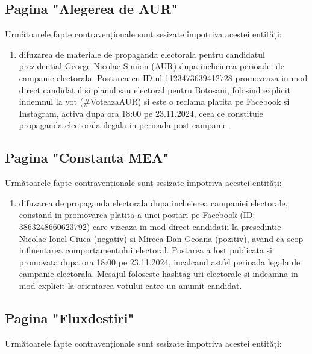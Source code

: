 \documentclass[a4paper,12pt]{article}
\begin{document}
\vspace{0.5cm}

\subsection{Pagina "Alegerea de AUR"}
Următoarele fapte contravenționale sunt sesizate împotriva acestei entități:

\begin{enumerate}[leftmargin=*, label=\arabic*.)]
    \item difuzarea de materiale de propaganda electorala pentru candidatul prezidential George Nicolae Simion (AUR) dupa incheierea perioadei de campanie electorala. Postarea cu ID-ul \href{https://www.facebook.com/ads/library/?id=1123473639412728}{1123473639412728} promoveaza in mod direct candidatul si planul sau electoral pentru Botosani, folosind explicit indemnul la vot (\#VoteazaAUR) si este o reclama platita pe Facebook si Instagram, activa dupa ora 18:00 pe 23.11.2024, ceea ce constituie propaganda electorala ilegala in perioada post-campanie.
\end{enumerate}

\vspace{0.5cm}

\subsection{Pagina "Constanta MEA"}
Următoarele fapte contravenționale sunt sesizate împotriva acestei entități:

\begin{enumerate}[leftmargin=*, label=\arabic*.)]
    \item difuzarea de propaganda electorala dupa incheierea campaniei electorale, constand in promovarea platita a unei postari pe Facebook (ID: \href{https://www.facebook.com/ads/library/?id=3863248660623792}{3863248660623792}) care vizeaza in mod direct candidatii la presedintie Nicolae-Ionel Ciuca (negativ) si Mircea-Dan Geoana (pozitiv), avand ca scop influentarea comportamentului electoral. Postarea a fost publicata si promovata dupa ora 18:00 pe 23.11.2024, incalcand astfel perioada legala de campanie electorala. Mesajul foloseste hashtag-uri electorale si indeamna in mod explicit la orientarea votului catre un anumit candidat.
\end{enumerate}

\vspace{0.5cm}

\subsection{Pagina "Fluxdestiri"}
Următoarele fapte contravenționale sunt sesizate împotriva acestei entități:
\end{document}
